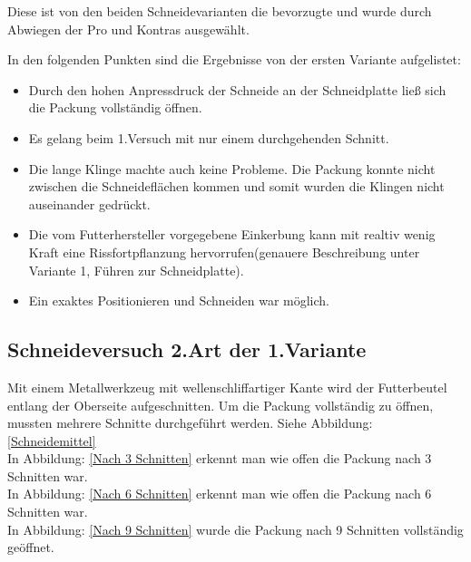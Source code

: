 Diese ist von den beiden Schneidevarianten die bevorzugte und wurde durch  Abwiegen der Pro und Kontras ausgewählt.

In den folgenden Punkten sind die Ergebnisse von der ersten Variante aufgelistet:

\begin{itemize}
\item Durch den hohen Anpressdruck der Schneide an der Schneidplatte ließ sich die Packung vollständig öffnen.
\item Es gelang beim 1.Versuch mit nur einem durchgehenden Schnitt.
\item Die lange Klinge machte auch keine Probleme. Die Packung konnte nicht zwischen die Schneideflächen kommen und somit wurden die Klingen nicht auseinander gedrückt.
\item Die vom Futterhersteller vorgegebene Einkerbung kann mit realtiv wenig Kraft eine Rissfortpflanzung hervorrufen(genauere Beschreibung unter Variante 1, Führen zur Schneidplatte).
\item Ein exaktes Positionieren und Schneiden war möglich.
\end{itemize} 
\newpage
\subsection{Schneideversuch 2.Art der 1.Variante}
\label{Schneideversuch_2}
Mit einem Metallwerkzeug mit wellenschliffartiger Kante wird der Futterbeutel entlang der Oberseite aufgeschnitten. Um die Packung vollständig zu öffnen, mussten mehrere Schnitte durchgeführt werden. Siehe Abbildung: \ref{Schneidemittel}\\
In Abbildung: \ref{Nach 3 Schnitten} erkennt man wie offen die Packung nach 3 Schnitten war.\\
In Abbildung: \ref{Nach 6 Schnitten} erkennt man wie offen die Packung nach 6 Schnitten war.\\
In Abbildung: \ref{Nach 9 Schnitten} wurde die Packung nach 9 Schnitten vollständig geöffnet.

